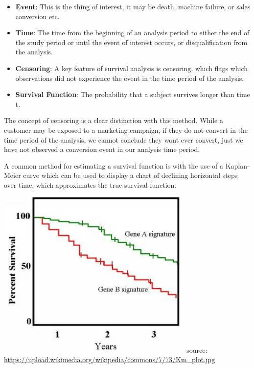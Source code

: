 \documentclass[]{book}
\providecommand{\tightlist}{%
  \setlength{\itemsep}{0pt}\setlength{\parskip}{0pt}}
\begin{document}
\begin{itemize}
\tightlist
\item
  \textbf{Event}: This is the thing of interest, it may be death, machine failure, or sales conversion etc.\\
\item
  \textbf{Time}: The time from the beginning of an analysis period to either the end of the
  study period or until the event of interest occurs, or disqualification from the analysis.\\
\item
  \textbf{Censoring}: A key feature of survival analysis is censoring, which flags which
  observations did not experience the event in the time period of the analysis.\\
\item
  \textbf{Survival Function}: The probability that a subject survives longer than time t.
\end{itemize}

The concept of censoring is a clear distinction with this method.
While a customer may be exposed to a marketing campaign, if they do not convert
in the time period of the analysis, we cannot conclude they wont ever convert, just
we have not observed a conversion event in our analysis time period.

A common method for estimating a survival function is with the use of a
Kaplan-Meier curve \citep{kaplan1958nonparametric} which can be used to display
a chart of declining horizontal steps over time, which approximates the
true survival function.

\includegraphics[width=3.84in]{img/Km_plot}
source: \url{https://upload.wikimedia.org/wikipedia/commons/7/73/Km_plot.jpg}
\end{document}
